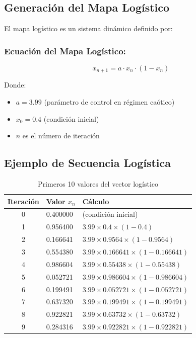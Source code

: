 \documentclass[12pt,a4paper]{article}
\begin{document}
	\subsection{Generación del Mapa Logístico}
	
	El mapa logístico es un sistema dinámico definido por:
	
	\subsubsection*{Ecuación del Mapa Logístico:}
	\begin{equation}
		x_{n+1} = a \cdot x_n \cdot (1 - x_n)
		\label{eq:logistic}
	\end{equation}
	
	Donde:
	\begin{itemize}
		\item $a = 3.99$ (parámetro de control en régimen caótico)
		\item $x_0 = 0.4$ (condición inicial)
		\item $n$ es el número de iteración
	\end{itemize}
	
	\subsection{Ejemplo de Secuencia Logística}
	
	\begin{table}[H]
		\centering
		\caption{Primeros 10 valores del vector logístico}
		\label{tab:logistic}
		\begin{tabular}{@{}cll@{}}
			\toprule
			\textbf{Iteración} & \textbf{Valor $x_n$} & \textbf{Cálculo} \\ \midrule
			0 & 0.400000 & (condición inicial) \\
			1 & 0.956400 & $3.99 \times 0.4 \times (1 - 0.4)$ \\
			2 & 0.166641 & $3.99 \times 0.9564 \times (1 - 0.9564)$ \\
			3 & 0.554380 & $3.99 \times 0.166641 \times (1 - 0.166641)$ \\
			4 & 0.986604 & $3.99 \times 0.55438 \times (1 - 0.55438)$ \\
			5 & 0.052721 & $3.99 \times 0.986604 \times (1 - 0.986604)$ \\
			6 & 0.199491 & $3.99 \times 0.052721 \times (1 - 0.052721)$ \\
			7 & 0.637320 & $3.99 \times 0.199491 \times (1 - 0.199491)$ \\
			8 & 0.922821 & $3.99 \times 0.63732 \times (1 - 0.63732)$ \\
			9 & 0.284316 & $3.99 \times 0.922821 \times (1 - 0.922821)$ \\ \bottomrule
		\end{tabular}
	\end{table}
	
\end{document}
